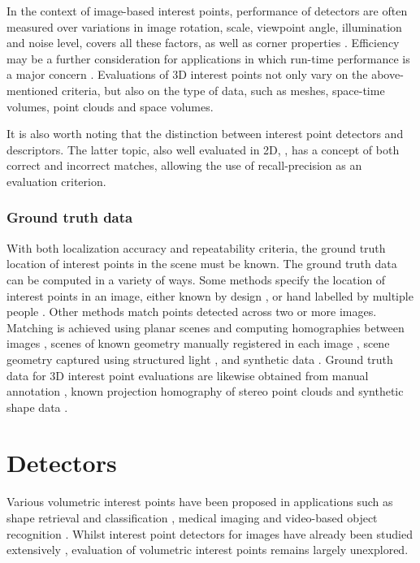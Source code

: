 In the context of image-based interest points, performance of detectors are often measured over variations in image rotation, scale, viewpoint angle, illumination and noise level, \eg \cite{Schmid2000} covers all these factors, as well as corner properties \cite{Rajan1989}. Efficiency may be a further consideration for applications in which run-time performance is a major concern \cite{Rosten2010}. Evaluations of 3D interest points not only vary on the above-mentioned criteria, but also on the type of data, such as meshes, space-time volumes, point clouds and space volumes.

It is also worth noting that the distinction between interest point detectors and descriptors. The latter topic, also well evaluated in 2D, \eg \cite{Mikolajczyk2005}, has a concept of both correct and incorrect matches, allowing the use of recall-precision as an evaluation criterion.

\subsubsection{Ground truth data}
With both localization accuracy and repeatability criteria, the ground truth location of interest points in the scene must be known. The ground truth data can be computed in a variety of ways. Some methods specify the location of interest points in an image, either known by design \cite{Rajan1989}, or hand labelled by multiple people \cite{Heath1997}. Other methods match points detected across two or more images. Matching is achieved using planar scenes and computing homographies between images \cite{Schmid2000}, scenes of known geometry manually registered in each image \cite{Rosten2010}, scene geometry captured using structured light \cite{Aanaes2012}, and synthetic data \cite{Laptev2005}. Ground truth data for 3D interest point evaluations are likewise obtained from manual annotation \cite{Dutagaci2011}, known projection homography of stereo point clouds \cite{Aanaes2012} and synthetic shape data \cite{Salti2011}. 

\section{Detectors}
\label{sec/eval/detectors}

Various volumetric interest points have been proposed in applications such as shape retrieval and classification \cite{Riemenschneider2009,Flitton2010,Knopp2010,Prasad2011}, medical imaging \cite{Criminisi2011,Ni2008,Donner2011} and video-based object recognition \cite{Willems2009,Laptev2005,Yu2010}. Whilst interest point detectors for images have already been studied extensively \cite{Mikolajczyk2005}, evaluation of volumetric interest points remains largely unexplored. 

